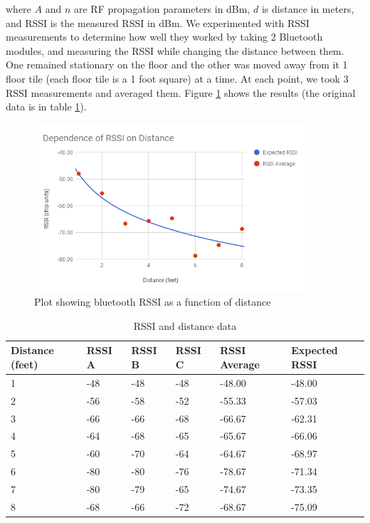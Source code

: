 \documentclass[]{article}
\begin{document}
where \(A\) and \(n\) are RF propagation parameters in dBm, \(d\) is
distance in meters, and RSSI is the measured RSSI in dBm. \cite{5415423}
We experimented with RSSI measurements to determine how well they worked
by taking 2 Bluetooth modules, and measuring the RSSI while changing the
distance between them. One remained stationary on the floor and the
other was moved away from it 1 floor tile (each floor tile is a 1 foot
square) at a time. At each point, we took 3 RSSI measurements and
averaged them. Figure \ref{fig:rssiplot} shows the results (the original data is in table \ref{table:rssidata}).

\begin{figure}
  \centering
  \includegraphics[width=0.9\textwidth]{rssi-chart.png}
  \caption{Plot showing bluetooth RSSI as a function of distance}
  \label{fig:rssiplot}
\end{figure}

\begin{table}
  \centering
  \begin{tabular}[]{@{}llllll@{}}
  \toprule
  Distance (feet) & RSSI A & RSSI B & RSSI C & RSSI Average & Expected
  RSSI \\
  \midrule
  1 & -48 & -48 & -48 & -48.00 & -48.00 \\
  2 & -56 & -58 & -52 & -55.33 & -57.03 \\
  3 & -66 & -66 & -68 & -66.67 & -62.31 \\
  4 & -64 & -68 & -65 & -65.67 & -66.06 \\
  5 & -60 & -70 & -64 & -64.67 & -68.97 \\
  6 & -80 & -80 & -76 & -78.67 & -71.34 \\
  7 & -80 & -79 & -65 & -74.67 & -73.35 \\
  8 & -68 & -66 & -72 & -68.67 & -75.09 \\
  \bottomrule
  \end{tabular}
  \caption{RSSI and distance data}
  \label{table:rssidata}
\end{table}
\end{document}

